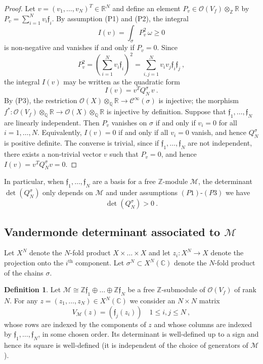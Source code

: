\documentclass[a4paper,10pt]{amsart}
\theoremstyle{definition}
\newtheorem{defn}[thm]{Definition}
\theoremstyle{remark}
\numberwithin{equation}{section}
\newcommand{\Z}{\mathbb Z}
\newcommand{\Q}{\mathbb Q}
\newcommand{\C}{\mathbb C}
\newcommand{\R}{\mathbb R}
\newcommand{\Or}{\mathcal{O}}
\newcommand{\ff}{\mathfrak{f}}
\newcommand{\0}{\color{blue}{\mathsf{0}}}
\begin{document}
\begin{proof}  Let $v=(v_1,\ldots, v_N)^T \in \R^N$ and 
define an element $P_v \in \Or(V_f)\otimes_{\Z}\R$  by  
$ P_v  = \sum^N_{i=1} v_i    \ff_i$.
By assumption  (P1) and (P2),  the  integral 
\[  I (v)= \int_{\sigma}   P_v^2 \,   \omega  \geq 0 \]
 is  non-negative and vanishes if and only if $P_v=0$. Since
 \[   P_v^2= \left( \sum_{i=1}^N  v_i \ff_i  \right)^2 =\sum_{i,j=1}^N  v_i v_j \ff_i \ff_j  \ , \] 
  the integral $I(v)$  
  may be written as the  quadratic form
\[ I(v) = v^T  Q^{\sigma}_{N} \, v   \  .   \]
By  (P3), the restriction $\Or(X)\otimes_{\Q} \R \rightarrow \mathcal{C}^{\infty}(\sigma)$ is injective; the morphism 
$f^* : \Or(V_f) \otimes_{\Q}\R \rightarrow \Or(X)\otimes_{\Q} \R$ is injective by definition. 
Suppose that  $\ff_1,\ldots, 
\ff_{N}$ are linearly independent. Then $P_v$ vanishes on $\sigma$ if and  only if $v_i=0$ for all $i=1,\ldots, N$. Equivalently, $I(v)=0$  if and only if all $v_i=0$ vanish, and hence  $Q^{\sigma}_N$ is positive definite. The converse is trivial, since 
if  $\ff_1,\ldots, \ff_N$ are not independent,  there exists a non-trivial vector $v$ such that $P_v=0$, and hence $I(v)= v^T Q^{\sigma}_N v=0$. 
 \end{proof} 

In particular, when $\ff_1,\ldots, \ff_N$ are a basis for a free $\Z$-module $\mathcal{M}$, the determinant $ \det( Q^{\sigma}_{N} ) $ only depends on $\mathcal{M}$ and under assumptions $(P1)$-$(P3)$ we have 
 \[ \det( Q^{\sigma}_{N} ) >0 \ .\]




\subsection{Vandermonde determinant associated to $\mathcal{M}$}
Let  $X^{N}$ denote the $N$-fold product $X \times \ldots \times X$ and let $z_i: X^N \rightarrow X$ denote the projection onto the $i^{\mathrm{th}}$ component.
Let $\sigma^{N} \subset X^{N}(\C)$ denote the $N$-fold product of  the chains $\sigma$. 



\begin{defn}
Let $\mathcal{M}   \cong \Z \ff_1 \oplus \ldots \oplus \Z \ff_N $ be a free $\Z$-submodule of $\mathcal{O}(V_f)$ of rank $N$.
For any $ z= (z_1,\ldots, z_{N}) \in X^N(\C)$ we consider an  $N\times N$ matrix 
\[ V_{\mathcal{M}} (z) =     (  \ff_j(z_i)) \quad 1\leq i,j\leq N\ ,  \]
whose rows are indexed by the components of $z$ and whose columns are indexed by $\ff_1,\ldots , \ff_N$, in some chosen order. Its determinant is well-defined up to a sign and hence its  square is well-defined (it is independent of the choice of generators of $\mathcal{M}$).
\end{defn} 
\end{document}
